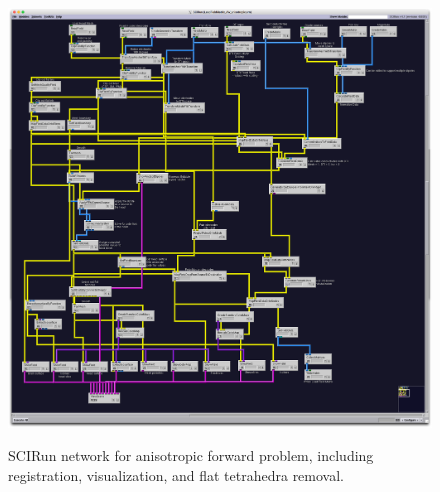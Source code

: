 \begin{figure}[p]
\begin{center}
\includegraphics[width=\textwidth]{Figures/aniso_network.png}\\
\caption{SCIRun network for anisotropic forward problem, including registration, visualization, and flat tetrahedra removal.}
\label{fig:anisofornet}
\end{center}
\end{figure}

